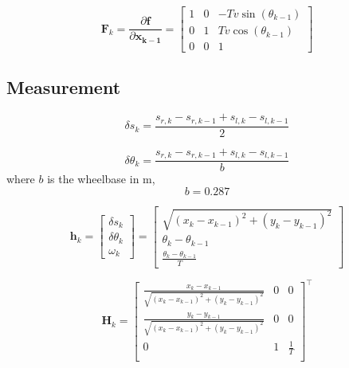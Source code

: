 \documentclass{ieeeaccess}
\begin{document}
	\begin{equation}
	\label{eq:Fsys}
		\boldsymbol{F}_{k} = \frac{\partial\boldsymbol{f}}{\partial\boldsymbol{x_{k-1}}}
		=
		\begin{bmatrix}
			1	&0	&-Tv\sin{\left(\theta_{k-1}\right)}	\\
			0	&1	&Tv\cos{\left(\theta_{k-1}\right)}	\\
			0	&0	&1
		\end{bmatrix}
	\end{equation}

\subsection{Measurement}

	\begin{equation}
	\label{eq:delts}
		\delta s_{k} = \frac{s_{r,k} - s_{r,k-1} + s_{l,k} - s_{l,k-1}}{2}
	\end{equation}
	
	\begin{equation}
	\label{eq:deltth}
		\delta \theta_{k} = \frac{s_{r,k} - s_{r,k-1} + s_{l,k} - s_{l,k-1}}{b}
	\end{equation}
	where $b$ is the wheelbase in m,
	\begin{equation}
	\label{eq:b}
		b = 0.287
	\end{equation}
	
	\begin{equation}
	\label{eq:hsys}
		\boldsymbol{h}_{ k} =
		\begin{bmatrix}
			\delta s_{k} 		\\
			\delta\theta_{k}	\\
			\omega_{k}
		\end{bmatrix}
		=
		\begin{bmatrix}
			\sqrt{\left(x_{k} - x_{k-1}\right)^{2} + \left(y_{k} - y_{k-1}\right)^{2}}	\\
			\theta_{k} - \theta_{k-1}								\\
			\frac{\theta_{k}-\theta_{k-1}}{T}
		\end{bmatrix}
	\end{equation}
	
	\begin{equation}
	\label{eq:Hsys}
		\boldsymbol{H}_{k}	=
		\begin{bmatrix}
			\frac{x_{k}-x_{k-1}}{\sqrt{\left( x_{k} - x_{k-1} \right)^{2}+\left( y_{k} - y_{k-1} \right)^{2}}}	&0	&0		\\
			\frac{y_{k}-y_{k-1}}{\sqrt{\left( x_{k} - x_{k-1} \right)^{2}+\left( y_{k} - y_{k-1} \right)^{2}}}	&0	&0		\\
			0															&1	&\frac{1}{T}	\\
		\end{bmatrix}^{\top}
	\end{equation}
\end{document}
